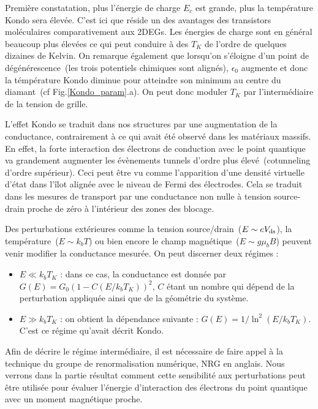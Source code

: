 Première constatation, plus l'énergie de charge $E_c$ est grande, plus la température Kondo sera élevée. C'est ici que réside un des avantages des transistors moléculaires comparativement aux 2DEGs. Les énergies de charge sont en général beaucoup plus élevées ce qui peut conduire à des $T_K$ de l'ordre de quelques dizaines de Kelvin. On remarque également que lorsqu'on s'éloigne d'un point de dégénérescence~(les trois potentiels chimiques sont alignés), $\epsilon_0$ augmente et donc la témpérature Kondo diminue pour atteindre son minimum au centre du diamant~(cf Fig.\ref{Kondo_param}.a). On peut donc moduler $T_K$ par l'intermédiaire de la tension de grille.

L'effet Kondo se traduit dans nos structures par une augmentation de la conductance, contrairement à ce qui avait été observé dans les matériaux massifs. En effet, la forte interaction des électrons de conduction avec le point quantique va grandement augmenter les évènements tunnels d'ordre plus élevé~(cotunneling d'ordre supérieur). Ceci peut être vu comme l'apparition d'une densité virtuelle d'état dans l'\^ilot alignée avec le niveau de Fermi des électrodes. Cela se traduit dans les mesures de transport par une conductance non nulle à tension source-drain proche de zéro à l'intérieur des zones des blocage. 

Des perturbations extérieures comme la tension source/drain~($E \sim eV_{\rm{ds}}$), la température~($E \sim k_bT$) ou bien encore le champ magnétique~($E \sim g \mu_bB$) peuvent venir modifier la conductance mesurée. On peut discerner deux régimes :
\begin{itemize}
\item $E \ll k_bT_K$ : dans ce cas, la conductance est donnée par $G(E) = G_0(1-C (E/k_bT_K))^2$, $C$ étant un nombre qui dépend de la perturbation appliquée ainsi que de la géométrie du système.
\item $E \gg k_bT_K$ : on obtient la dépendance suivante : $G(E) = 1/\ln^2(E/k_bT_K)$. C'est ce régime qu'avait décrit Kondo.
\end{itemize}
Afin de décrire le régime intermédiaire, il est nécessaire de faire appel à la technique du groupe de renormalisation numérique, NRG en anglais. Nous verrons dans la partie résultat comment cette sensibilité aux perturbations peut \^etre utilisée pour évaluer l'énergie d'interaction des électrons du point quantique avec un moment magnétique proche.